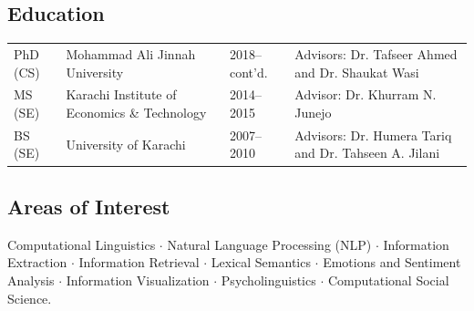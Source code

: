 \documentclass[a4paper, 10pt]{article}
\begin{document}

\subsection*{\textcolor{NavyBlue}{Education}}
{
\tabcolsep=3pt
\begin{tabular}{llll}
PhD (CS) & Mohammad Ali Jinnah University & 2018--cont'd. & Advisors: Dr. Tafseer Ahmed and Dr. Shaukat Wasi\\
MS (SE) & Karachi Institute of Economics \& Technology & 2014--2015 & Advisor: Dr. Khurram N. Junejo\\
BS (SE) & University of Karachi & 2007--2010 & Advisors: Dr. Humera Tariq and Dr. Tahseen A. Jilani\\
\end{tabular}
}

\subsection*{\textcolor{NavyBlue}{Areas of Interest}}
Computational Linguistics $\cdot$ Natural Language Processing (NLP) $\cdot$ Information Extraction $\cdot$ Information Retrieval $\cdot$ Lexical Semantics $\cdot$ Emotions and Sentiment Analysis $\cdot$ Information Visualization $\cdot$ Psycholinguistics $\cdot$ Computational Social Science.
\end{document}
